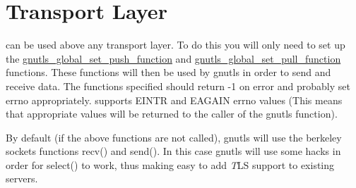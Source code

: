 \section{Transport Layer}
\par
\gnutls can be used above any transport layer. To do this you will only 
need to set up the 
\hyperref{gnutls\_global\_set\_push\_function()}{gnutls\_global\_set\_push\_function() (see Section }{
for more information)}{gnutls_global_set_push_function} and
\hyperref{gnutls\_global\_set\_pull\_function()}{gnutls\_global\_set\_pull\_function() (see Section }{
for more information)}{gnutls_global_set_pull_function}
functions. These functions will then be used by gnutls in order to send and receive data.
The functions specified should return -1 on error and probably set errno appropriately.
\gnutls supports EINTR and EAGAIN errno values (This means that appropriate
values will be returned to the caller of the gnutls function).
\par
By default (if the above functions are not called), gnutls will use
the berkeley sockets functions recv() and send(). In this case
gnutls will use some hacks in order for select() to work, thus
making easy to add {\emph TLS} support to existing servers.


